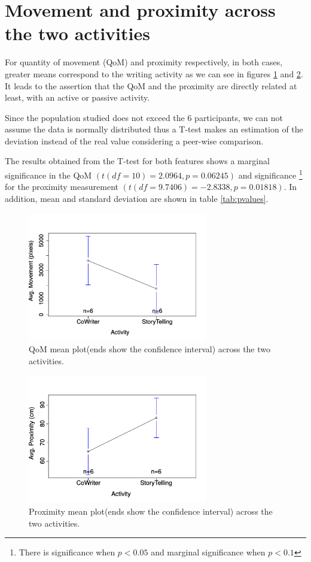 \section{Movement and proximity across the two activities}
For quantity of movement (QoM) and proximity respectively, in both cases, greater means correspond to the writing activity as we can see in figures \ref{fig:meanMov} and \ref{fig:meanProx}. It leads to the assertion that the QoM and the proximity are directly related at least, with an active or passive activity.

Since the population studied does not exceed the 6 participants, we can not assume the data is normally distributed thus a T-test makes an estimation of the deviation instead of the real value considering a peer-wise comparison.

The results obtained from the T-test for both features shows a marginal significance in the QoM $ (t(df=10)= 2.0964, p = 0.06245) $ and significance \footnote{There is significance when $p<0.05$ and marginal significance when $p<0.1$} for the proximity measurement $(t(df=9.7406)= -2.8338, p = 0.01818) $. In addition, mean and standard deviation are shown in table \ref{tab:pvalues}.

\begin{figure}[h!]
        \centering
        \includegraphics[width=0.7\textwidth]{figures/AvgMovement}
        \caption{QoM mean plot(ends show the confidence interval) across the two activities.}
		\label{fig:meanMov}
\end{figure}


\begin{figure}[h!]
        \centering
        \includegraphics[width=0.7\textwidth]{figures/AvgProximity.pdf}
        \caption{Proximity mean plot(ends show the confidence interval) across the two activities.}
		\label{fig:meanProx}
\end{figure}


